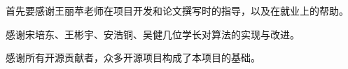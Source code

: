 \begin{acknowledgement}

    首先要感谢王丽苹老师在项目开发和论文撰写时的指导，以及在就业上的帮助。

    感谢宋培东、王彬宇、安浩铜、吴健几位学长对算法的实现与改进。

    感谢所有开源贡献者，众多开源项目构成了本项目的基础。

\end{acknowledgement}
